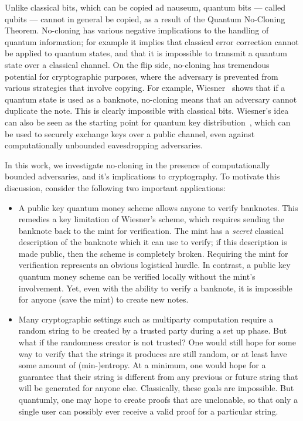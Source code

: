\label{sec:intro}

Unlike classical bits, which can be copied ad nauseum, quantum bits --- called qubits --- cannot in general be copied, as a result of the Quantum No-Cloning Theorem.  No-cloning has various negative implications to the handling of quantum information; for example it implies that classical error correction cannot be applied to quantum states, and that it is impossible to transmit a quantum state over a classical channel.  On the flip side, no-cloning has tremendous potential for cryptographic purposes, where the adversary is prevented from various strategies that involve copying.  For example, Wiesner~\cite{Wiesner83} shows that if a quantum state is used as a banknote, no-cloning means that an adversary cannot duplicate the note.  This is clearly impossible with classical bits.  Wiesner's idea can also be seen as the starting point for quantum key distribution~\cite{BenBra84}, which can be used to securely exchange keys over a public channel, even against computationally unbounded eavesdropping adversaries.

In this work, we investigate no-cloning in the presence of computationally bounded adversaries, and it's implications to cryptography.  To motivate this discussion, consider the following two important applications:
\begin{itemize}
	\item A public key quantum money scheme allows anyone to verify banknotes.  This remedies a key limitation of Wiesner's scheme, which requires sending the banknote back to the mint for verification.  The mint has a \emph{secret} classical description of the banknote which it can use to verify; if this description is made public, then the scheme is completely broken.  Requiring the mint for verification represents an obvious logistical hurdle.  In contrast, a public key quantum money scheme can be verified locally without the mint's involvement.  Yet, even with the ability to verify a banknote, it is impossible for anyone (save the mint) to create new notes.
	\item Many cryptographic settings such as multiparty computation require a random string to be created by a trusted party during a set up phase.  But what if the randomness creator is not trusted?  One would still hope for some way to verify that the strings it produces are still random, or at least have some amount of (min-)entropy.  At a minimum, one would hope for a guarantee that their string is different from any previous or future string that will be generated for anyone else.  Classically, these goals are impossible.  But quantumly, one may hope to create proofs that are unclonable, so that only a single user can possibly ever receive a valid proof for a particular string.
\end{itemize}

